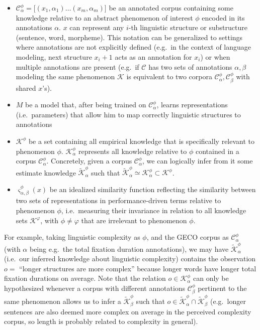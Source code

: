 \documentclass[a4paper, nobind]{templates/ociamthesis}
\begin{document}
\begin{itemize}
\item
  \(\mathcal{C}^\phi_\alpha = \Big [ (x_1,\alpha_1)\dots(x_m,\alpha_m)\Big]\) be an annotated corpus containing some knowledge relative to an abstract phenomenon of interest \(\phi\) encoded in its annotations \(\alpha\). \(x\) can represent any \(i\)-th linguistic structure or substructure (sentence, word, morpheme). This notation can be generalized to settings where annotations are not explicitly defined (e.g.~in the context of language modeling, next structure \(x_i+1\) acts as an annotation for \(x_i\)) or when multiple annotations are present (e.g.~if \(\mathcal{C}\) has two sets of annotations \(\alpha, \beta\) modeling the same phenomenon \(\mathcal{K}\) is equivalent to two corpora \(\mathcal{C}^\phi_\alpha, \mathcal{C}^\phi_\beta\) with shared \(x\)'s).
\item
  \(M\) be a model that, after being trained on \(\mathcal{C}^{\phi}_\alpha\), learns representations (i.e.~parameters) that allow him to map correctly linguistic structures to annotations
\item
  \(\mathcal{K}^\phi\) be a set containing all empirical knowledge that is specifically relevant to phenomenon \(\phi\). \(\mathcal{K}^\phi_\alpha\) represents all knowledge relative to \(\phi\) contained in a corpus \(\mathcal{C}^\phi_\alpha\). Concretely, given a corpus \(\mathcal{C}^\phi_\alpha\), we can logically infer from it some estimate knowledge \(\tilde{\mathcal{K}}^\phi_\alpha\) such that \(\tilde{\mathcal{K}}^\phi_\alpha \simeq \mathcal{K}^\phi_\alpha \subset \mathcal{K}^\phi\).
\item
  \(\varsigma_{\alpha, \beta}^{\phi}(x)\) be an idealized similarity function reflecting the similarity between two sets of representations in performance-driven terms relative to phenomenon \(\phi\), i.e.~measuring their invariance in relation to all knowledge sets \(\mathcal{K}^\varphi\), with \(\phi \neq \varphi\) that are irrelevant to phenomenon \(\phi\).
\end{itemize}

For example, taking linguistic complexity as \(\phi\), and the GECO corpus as \(\mathcal{C}^\phi_\alpha\) (with \(\alpha\) being e.g.~the total fixation duration annotations), we may have \(\tilde{\mathcal{K}}^\phi_\alpha\) (i.e.~our inferred knowledge about linguistic complexity) contains the observation \(o =\) ``longer structures are more complex'' because longer words have longer total fixation durations on average. Note that the relation \(o \in \mathcal{K}^\phi_\alpha\) can only be hypothesized whenever a corpus with different annotations \(\mathcal{C}^\phi_\beta\) pertinent to the same phenomenon allows us to infer a \(\tilde{\mathcal{K}}^\phi_\beta\) such that \(o \in \tilde{\mathcal{K}}^\phi_\alpha \cap \tilde{\mathcal{K}}^\phi_\beta\) (e.g.~longer sentences are also deemed more complex on average in the perceived complexity corpus, so length is probably related to complexity in general).
\end{document}
